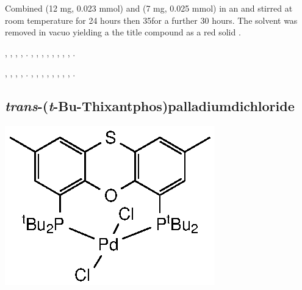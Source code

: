 Combined  (12 mg, 0.023 mmol) and \ce{[Pd(COD)Cl2]} (7 mg, 0.025 mmol) in an  and stirred at room temperature for 24 hours then 35\degC for a further 30 hours.  The solvent was removed in vacuo yielding a the title compound as a red solid .

,
,
,
,
.
,
,
,
,
,
,
,
,
.

,
,
,
,
.
,
,
,
,
,
,
,
,
.

\subsection*{\emph{trans}-(\emph{t}-Bu-Thixantphos)palladiumdichloride}
\begin{structure}[h]
\begin{center}
\includegraphics{../Structures/StBuPdCl2.eps}
\end{center}
\end{structure}

